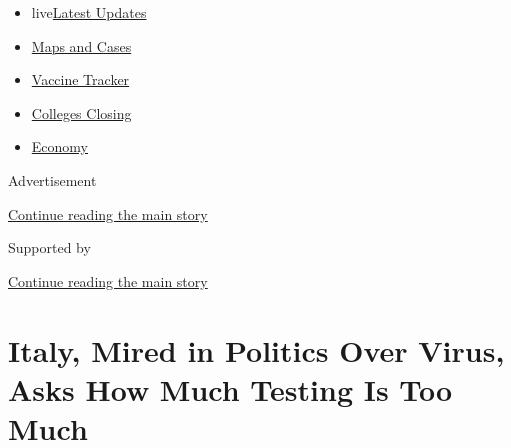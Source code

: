 \begin{itemize}
\tightlist
\item
  live\href{https://www.nytimes3xbfgragh.onion/2020/08/21/world/covid-19-coronavirus.html?name=styln-coronavirus-national\&region=TOP_BANNER\&variant=undefined\&block=storyline_menu_recirc\&action=click\&pgtype=Article\&impression_id=c40f9611-e3ab-11ea-aee9-2d912d37c825}{Latest
  Updates}
\item
  \href{https://www.nytimes3xbfgragh.onion/interactive/2020/us/coronavirus-us-cases.html?name=styln-coronavirus-national\&region=TOP_BANNER\&variant=undefined\&block=storyline_menu_recirc\&action=click\&pgtype=Article\&impression_id=c40f9612-e3ab-11ea-aee9-2d912d37c825}{Maps
  and Cases}
\item
  \href{https://www.nytimes3xbfgragh.onion/interactive/2020/science/coronavirus-vaccine-tracker.html?name=styln-coronavirus-national\&region=TOP_BANNER\&variant=undefined\&block=storyline_menu_recirc\&action=click\&pgtype=Article\&impression_id=c40f9613-e3ab-11ea-aee9-2d912d37c825}{Vaccine
  Tracker}
\item
  \href{https://www.nytimes3xbfgragh.onion/2020/08/19/us/colleges-closing-covid.html?name=styln-coronavirus-national\&region=TOP_BANNER\&variant=undefined\&block=storyline_menu_recirc\&action=click\&pgtype=Article\&impression_id=c40fbd20-e3ab-11ea-aee9-2d912d37c825}{Colleges
  Closing}
\item
  \href{https://www.nytimes3xbfgragh.onion/live/2020/08/21/business/stock-market-today-coronavirus?name=styln-coronavirus-national\&region=TOP_BANNER\&variant=undefined\&block=storyline_menu_recirc\&action=click\&pgtype=Article\&impression_id=c40fbd21-e3ab-11ea-aee9-2d912d37c825}{Economy}
\end{itemize}

Advertisement

\protect\hyperlink{after-top}{Continue reading the main story}

Supported by

\protect\hyperlink{after-sponsor}{Continue reading the main story}

\hypertarget{italy-mired-in-politics-over-virus-asks-how-much-testing-is-too-much}{%
\section{Italy, Mired in Politics Over Virus, Asks How Much Testing Is
Too
Much}\label{italy-mired-in-politics-over-virus-asks-how-much-testing-is-too-much}}

